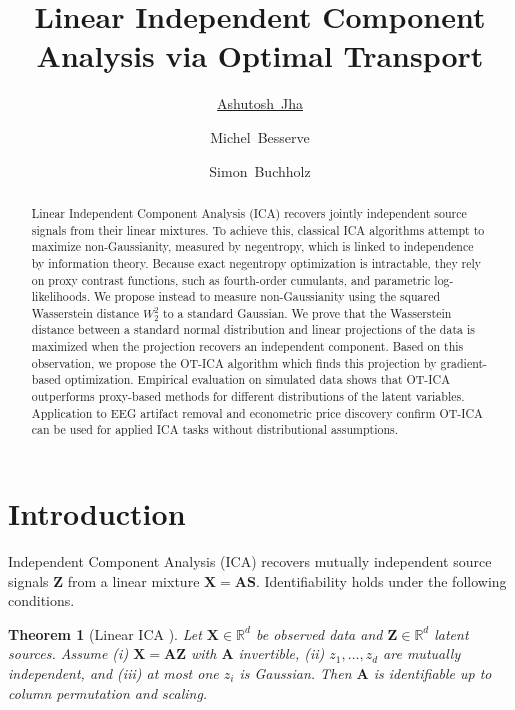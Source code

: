 \documentclass[accepted]{tpm2026} %
\title{Linear Independent Component Analysis via Optimal Transport}
\author[3]{\href{mailto:ashutoshjha3103@gmail.com?Subject=TPM 2026 Paper Inquiry}{Ashutosh~Jha}}
\author[1,2]{Michel~Besserve}
\author[1]{Simon~Buchholz}
\affil[1]{%
    Max Planck Institute for Intelligent Systems, T\"ubingen
}
\affil[2]{%
    Institute of Artificial Intelligence\\
    TU Braunschweig
}
\affil[3]{%
    Methods Center\\
    University of T\"ubingen
}
\newtheorem{theorem}{Theorem}
\begin{document}
\maketitle

\begin{abstract}
Linear Independent Component Analysis (ICA) recovers jointly independent source signals from their linear mixtures. 
 To achieve this, classical ICA algorithms attempt to maximize non-Gaussianity, measured by negentropy, which is linked to independence by information theory. Because exact negentropy optimization is intractable, they rely on proxy contrast functions, such as fourth-order cumulants, and parametric log-likelihoods. 
We propose instead to measure non-Gaussianity using the squared Wasserstein distance $W_2^2$ to a standard Gaussian.
We prove that the Wasserstein distance between a standard normal distribution and linear projections of the data  is maximized when the projection recovers an independent component.
Based on this observation, we propose the OT-ICA algorithm which  finds this projection by gradient-based optimization.
Empirical evaluation on simulated data shows that 
OT-ICA outperforms proxy-based methods for different distributions of the latent variables.
Application to EEG artifact removal and econometric price discovery confirm OT-ICA can be used for applied ICA tasks without distributional assumptions.

\end{abstract}

\section{Introduction}
Independent Component Analysis (ICA) \citep{jutten1985, comon1994} recovers mutually independent source signals $\mathbf{Z}$ from 
a linear mixture $\mathbf{X} = \mathbf{A}\mathbf{S}$. Identifiability holds under the following conditions.

\begin{theorem}[Linear ICA \citep{comon1994}]
Let $\mathbf{X} \in \mathbb{R}^d$ be observed data and $\mathbf{Z} \in \mathbb{R}^d$ latent sources. 
Assume (i) $\mathbf{X} = \mathbf{A}\mathbf{Z}$ with $\mathbf{A}$ invertible, (ii) $z_1, \dots, z_d$ are mutually independent, 
and (iii) at most one $z_i$ is Gaussian. Then $\mathbf{A}$ is identifiable up to column permutation and scaling.
\end{theorem}
\end{document}
